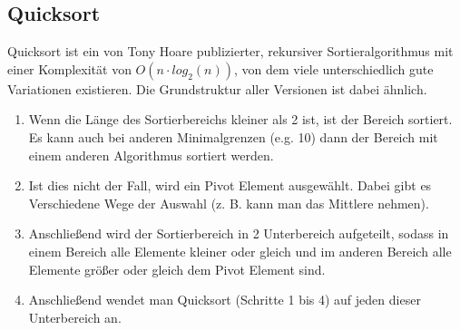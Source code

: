\begin{figure}[H]
    \centering
\end{figure}

\clearpage

\subsection{Quicksort}

Quicksort ist ein von Tony Hoare publizierter, rekursiver Sortieralgorithmus mit einer
Komplexität von $O(n \cdot log_{2}(n))$, von dem viele unterschiedlich gute Variationen existieren.
Die Grundstruktur aller Versionen ist dabei ähnlich.

\begin{enumerate}
    \item Wenn die Länge des Sortierbereichs kleiner als 2 ist, ist der Bereich sortiert.
    Es kann auch bei anderen Minimalgrenzen (e.g. 10) dann der Bereich mit einem anderen
    Algorithmus sortiert werden.
    \item Ist dies nicht der Fall, wird ein Pivot Element ausgewählt. Dabei gibt es Verschiedene
    Wege der Auswahl (z. B. kann man das Mittlere nehmen).
    \item Anschließend wird der Sortierbereich in 2 Unterbereich aufgeteilt, sodass in einem
    Bereich alle Elemente kleiner oder gleich und im anderen Bereich alle Elemente größer oder gleich
    dem Pivot Element sind.
    \item Anschließend wendet man Quicksort (Schritte 1 bis 4) auf jeden dieser Unterbereich an.
\end{enumerate}

